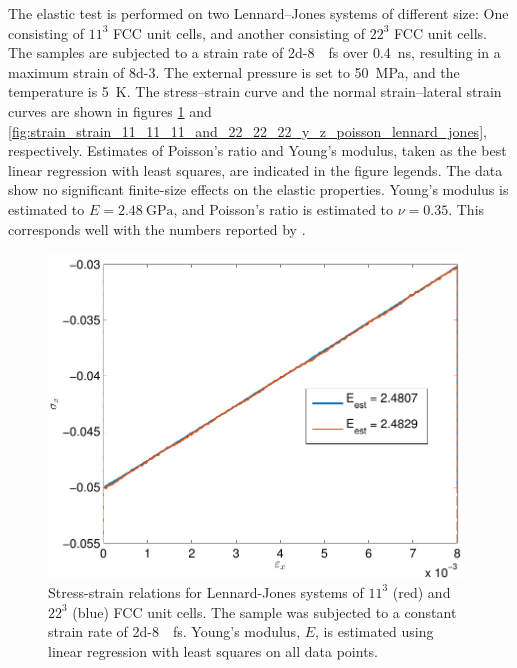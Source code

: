 The elastic test is performed on two Lennard--Jones systems of different size: 
One consisting of $11^3$ FCC unit cells, and another consisting of $22^3$ FCC unit cells. The samples are subjected to a strain rate of \SI{2d-8}{\per\femto\second} over \SI{0.4}{\nano\second}, resulting in a maximum strain of \SI{8d-3}{}. The external pressure is set to \SI{50}{\mega\pascal}, and the temperature is \SI{5}{\kelvin}. The stress--strain curve and the normal strain--lateral strain curves are shown in figures \ref{fig:stress_strain_11_11_11_and_22_22_22_y_z_poisson_lennard_jones} and \ref{fig:strain_strain_11_11_11_and_22_22_22_y_z_poisson_lennard_jones}, respectively. Estimates of Poisson's ratio and Young's modulus, taken as the best linear regression with least squares, are indicated in the figure legends. The data show no significant finite-size effects on the elastic properties. Young's modulus is estimated to $E = \SI{2.48}{\giga\pascal}$, and Poisson's ratio is estimated to $\nu = 0.35$. This corresponds well with the numbers reported by \citet{Quesnel1993}.

\begin{figure}
\centering
\includegraphics[width=11cm]{../figures/thesis/stress_strain_11_11_11_and_22_22_22_y_z_poisson_lennard_jones.pdf}
\caption{Stress-strain relations for Lennard-Jones systems of $11^3$ (red) and $22^3$ (blue) FCC unit cells. The sample was subjected to a constant strain rate of \SI{2d-8}{\per\femto\second}. Young's modulus, $E$, is estimated using linear regression with least squares on all data points.}
\label{fig:stress_strain_11_11_11_and_22_22_22_y_z_poisson_lennard_jones}
\end{figure}

